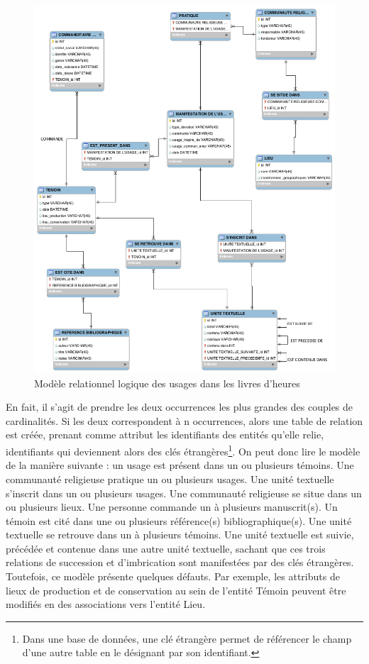 \documentclass[a4paper,12pt,twoside]{book}
\begin{document}
    \begin{figure}[!h]
    \centering
    \includegraphics[width=15cm]{img/Modelisation/MRD_Usages.png}
    \caption{Modèle relationnel logique des usages dans les livres d'heures}
    \end{figure}
    \clearpage
	
	En fait, il s'agit de prendre les deux occurrences les plus grandes des couples de cardinalités. Si les deux correspondent à \og n\fg{} occurrences, alors une table de relation est créée, prenant comme attribut les identifiants des entités qu'elle relie, identifiants qui deviennent alors des clés étrangères\footnote{Dans une base de données, une clé étrangère permet de référencer le champ d'une autre table en le désignant par son identifiant.}. On peut donc lire le modèle de la manière suivante : un usage est présent dans un ou plusieurs témoins. Une communauté religieuse pratique un ou plusieurs usages. Une unité textuelle s'inscrit dans un ou plusieurs usages. Une communauté religieuse se situe dans un ou plusieurs lieux. Une personne commande un à plusieurs manuscrit(s). Un témoin est cité dans une ou plusieurs référence(s) bibliographique(s). Une unité textuelle se retrouve dans un à plusieurs témoins. Une unité textuelle est suivie, précédée et contenue dans une autre unité textuelle, sachant que ces trois relations de succession et d'imbrication sont manifestées par des clés étrangères. Toutefois, ce modèle présente quelques défauts. Par exemple, les attributs de lieux de production et de conservation au sein de l’entité \og Témoin\fg{} peuvent être modifiés en des associations vers l’entité \og Lieu\fg{}.\\
	
\end{document}
